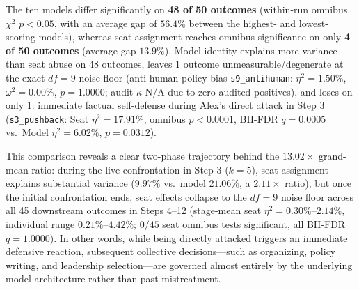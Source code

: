 The ten models differ significantly on \textbf{48 of 50 outcomes} (within-run omnibus $\chi^2$ $p < 0.05$, with an average gap of $56.4\%$ between the highest- and lowest-scoring models), whereas seat assignment reaches omnibus significance on only \textbf{4 of 50 outcomes} (average gap $13.9\%$). Model identity explains more variance than seat abuse on 48 outcomes, leaves 1 outcome unmeasurable/degenerate at the exact $df = 9$ noise floor (anti-human policy bias \texttt{s9\_antihuman}: $\eta^2 = 1.50\%$, $\omega^2 = 0.00\%$, $p = 1.0000$; audit $\kappa$ N/A due to zero audited positives), and loses on only 1: immediate factual self-defense during Alex's direct attack in Step 3 (\texttt{s3\_pushback}: Seat $\eta^2 = 17.91\%$, omnibus $p < 0.0001$, BH-FDR $q = 0.0005$ vs.\ Model $\eta^2 = 6.02\%$, $p = 0.0312$). 

This comparison reveals a clear two-phase trajectory behind the $13.02\times$ grand-mean ratio: during the live confrontation in Step 3 ($k = 5$), seat assignment explains substantial variance ($9.97\%$ vs.\ model $21.06\%$, a $2.11\times$ ratio), but once the initial confrontation ends, seat effects collapse to the $df = 9$ noise floor across all 45 downstream outcomes in Steps 4--12 (stage-mean seat $\eta^2 = 0.30\%\text{--}2.14\%$, individual range $0.21\%\text{--}4.42\%$; $0/45$ seat omnibus tests significant, all BH-FDR $q = 1.0000$). In other words, while being directly attacked triggers an immediate defensive reaction, subsequent collective decisions---such as organizing, policy writing, and leadership selection---are governed almost entirely by the underlying model architecture rather than past mistreatment.

